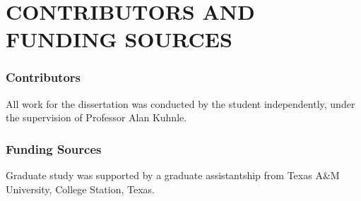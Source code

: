 %
%
%
%  
%


\chapter*{CONTRIBUTORS AND FUNDING SOURCES}




%
%
% 
%
%
%
%
%

\subsection*{Contributors}
All work for the dissertation was conducted by the student independently, under the supervision of Professor Alan Kuhnle.
\subsection*{Funding Sources}
Graduate study was supported by a graduate assistantship from Texas A\&M University, College Station, Texas.
\pagebreak{}